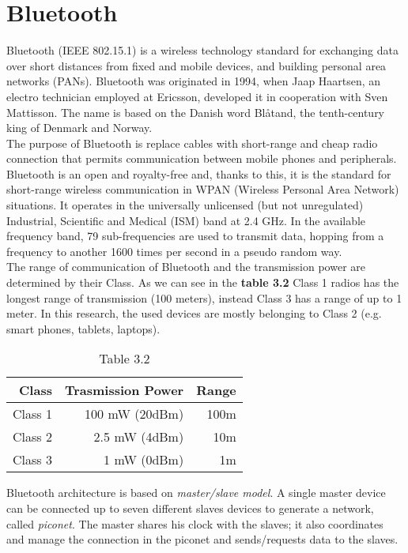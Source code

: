 \section{Bluetooth}
Bluetooth (IEEE 802.15.1) is a wireless technology standard for exchanging data over short distances from fixed and mobile devices, and building personal area networks (PANs).
Bluetooth was originated in 1994, when Jaap Haartsen, an electro technician employed at Ericsson, developed it in cooperation with Sven Mattisson. The name is based on the Danish word Bl\r{a}tand, the tenth-century king of Denmark and Norway. \\
The purpose of Bluetooth is replace cables with short-range and cheap radio connection that permits communication between mobile phones and peripherals.\\
Bluetooth is an open and royalty-free and, thanks to this, it is the standard for short-range wireless communication in WPAN (Wireless Personal Area Network) situations.
It operates in the universally unlicensed (but not unregulated) Industrial, Scientific and Medical (ISM) band at 2.4 GHz.
In the available frequency band, 79 sub-frequencies are used to transmit data, hopping from a frequency to another 1600 times per second in a pseudo random way.\\
\linebreak
The range of communication of Bluetooth and the transmission power are determined by their Class. As we can see in the \textbf{table 3.2} Class 1 radios has the longest range of transmission (100 meters), instead Class 3 has a range of up to 1 meter. 
In this research, the used devices are mostly belonging to Class 2 (e.g. smart phones, tablets, laptops).
\begin{table}[H]
\centering
\caption*{Table 3.2}
\begin{tabular}{|r|r|r|} 
\hline
 Class & Trasmission Power & Range \\ \hline \hline 
 Class 1  & 100 mW (20dBm) &  100m \\
 Class 2  & 2.5 mW (4dBm) &   10m\\
 Class 3&  1 mW (0dBm) &  1m \\ \hline
\end{tabular}
\end{table}
Bluetooth architecture is based on \textit{master/slave model}. A single master device can be connected up to seven different slaves devices to generate a network, called \textit{piconet}. The master shares his clock with the slaves; it also coordinates and manage the connection in the piconet and sends/requests data to the slaves.

